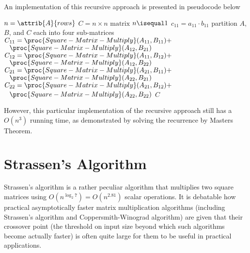 An implementation of this recursive approach is presented in pseudocode below
\begin{codebox}
    \li $n = \attrib{A}{rows}$
    \li $C = \text{$n\times n$ matrix}$ 
    \li \If $n \isequal 1$ \Then
        \li $c_{11} = a_{11} \cdot b_{11}$
    \Else
        \li partition $A$, $B$, and $C$ each into four sub-matrices
        \li $C_{11} = \proc{Square-Matrix-Multiply}(A_{11},B_{11}) + $
        \zi \> $\phantom{=}\proc{Square-Matrix-Multiply}(A_{12},B_{21})$
        \li $C_{12} = \proc{Square-Matrix-Multiply}(A_{11},B_{12}) + $
        \zi \> $\phantom{=}\proc{Square-Matrix-Multiply}(A_{12},B_{22})$
        \li $C_{21} = \proc{Square-Matrix-Multiply}(A_{21},B_{11}) + $
        \zi \> $\phantom{=}\proc{Square-Matrix-Multiply}(A_{22},B_{21})$
        \li $C_{22} = \proc{Square-Matrix-Multiply}(A_{21},B_{12}) + $
        \zi \> $\phantom{=}\proc{Square-Matrix-Multiply}(A_{22},B_{22})$
    \End
    \li \Return $C$ 
\end{codebox}
However, this particular implementation of the recursive approach still has a $O(n^3)$ running time, as demonstrated by solving the recurrence by Masters Theorem.

\section{Strassen's Algorithm}

Strassen's algorithm is a rather peculiar algorithm that multiplies two square matrices using $O(n^{\log_2 7}) = O(n^{2.81})$ scalar operations. It is debatable how practical asymptotically faster matrix multiplication algorithms (including Strassen's algorithm and Coppersmith-Winograd algorithm) are given that their crossover point (the threshold on input size beyond which such algorithms become actually faster) is often quite large for them to be useful in practical applications.

